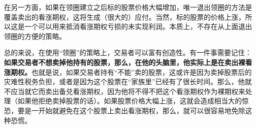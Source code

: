 在另一方面，如果在领圈建立之后标的股票价格大幅增加，唯一退出领圈的方法是覆盖卖出的看涨期权，这将生成（很大的）应付。当然，标的股票的价格上涨，所以这是一个可以用来抵消看涨期权亏损的未实现利润。本质上，不存在从上面退出领圈的方便的策略。

总的来说，在使用“领圈”的策略上，交易者可以富有创造性。有一件事需要记住：\textbf{如果交易者不想卖掉他持有的股票，那么，在他的头脑里，他实际上是在卖出裸看涨期权。}也就是说，如果交易者持有“不能”卖的股票，这或许是因为卖掉股票后的灾难性税务负担，或者是因为这个股票在“家族里”已经有了很长时间。那么，他就不应当就它而卖出备兑看涨期权，因为他将不得不把这个看涨期权作为裸期权来处理（如果他拒绝卖掉股票的话）。如果股票价格大幅上涨，这就会造成相当大的惊恐，要是一开始就避免在这个股票上卖出看涨期权，那么，就可以很容易地免除这种恐慌。